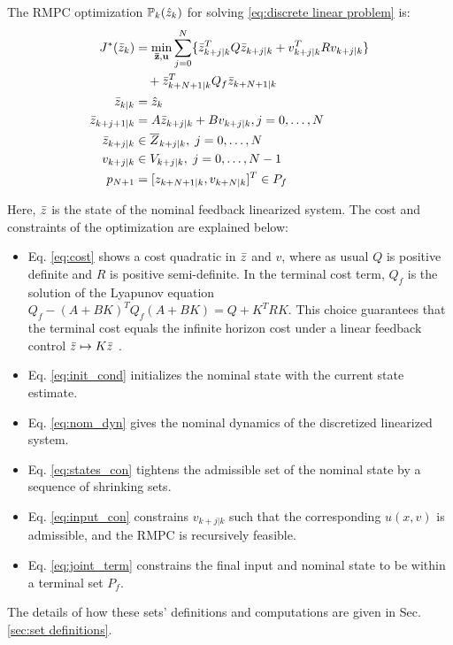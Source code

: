 The RMPC optimization $\mathbb{P}_{k}(\hat{z}_{k})$ for solving \eqref{eq:discrete linear problem} is:
\begin{subequations} 
\label{eq:nom mpc}
\begin{align}
J^{*}(\bar{z}_{k}) &= \min_{\mathbf{\bar{z}},\mathbf{u}} \sum_{j=0}^{N}\lbrace \bar{z}_{k+j|k}^{T}Q \bar{z}_{k+j|k} + {v}_{k+j|k}^{T}R{v}_{k+j|k}\rbrace \nonumber \\ 
                    &\quad  +  \bar{z}_{k+N+1|k}^T Q_f \bar{z}_{k+N+1|k}  \label{eq:cost} \\
\bar{z}_{k|k}       &= \hat{z}_{k} \label{eq:init_cond}\\
\bar{z}_{k+j+1|k} &=A\bar{z}_{k+j|k} + Bv_{k+j|k} , j=0,\ldots,N\label{eq:nom_dyn} \\
\bar{z}_{k+j|k}     & \in \overline{Z}_{k+j|k} , \; j=0,\ldots,N \label{eq:states_con}\\
v_{k+j|k}        & \in  V_{k+j|k} , \;j=0,\ldots,N-1 \label{eq:input_con} \\
p_{N+1}               &= \lbrack z_{k+N+1|k} , v_{k+N|k} \rbrack^{T}  \in P_f \label{eq:joint_term} 
	\end{align}
\end{subequations}

Here, $\bar{z}$ is the state of the nominal feedback linearized system.
The cost and constraints of the optimization are explained below:
\begin{itemize}
\item Eq. \eqref{eq:cost} shows a cost quadratic in $\bar{z}$ and $v$, where as usual $Q$ is positive definite and $R$ is positive semi-definite. 
In the terminal cost term, $Q_f$ is the solution of the Lyapunov equation $Q_f-(A+BK)^{T}Q_f(A+BK) = Q+K^{T}RK$.
This choice guarantees that the terminal cost equals the infinite horizon cost under a linear feedback control $\bar{z} \mapsto K\bar{z}$ \cite{CannonK15MPC}.

\item Eq. \eqref{eq:init_cond} initializes the nominal state with the current state estimate.

\item Eq. \eqref{eq:nom_dyn} gives the nominal dynamics of the discretized linearized system.

\item Eq. \eqref{eq:states_con} tightens the admissible set of the nominal state by a sequence of shrinking sets.

\item Eq. \eqref{eq:input_con} constrains $v_{k+j|k}$ such that the corresponding $u(x,v)$ is admissible, and the RMPC is recursively feasible.

\item Eq. \eqref{eq:joint_term} constrains the final input and nominal state to be within a terminal set $P_f$.

\end{itemize}

The details of how these sets' definitions and computations are given in Sec. \ref{sec:set definitions}.







